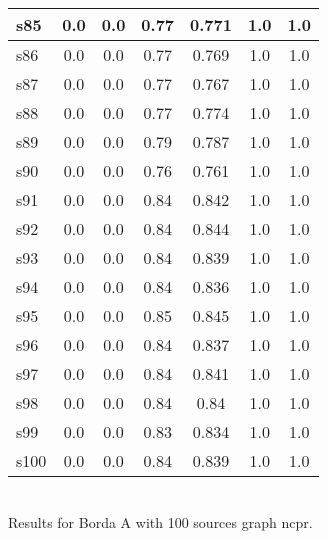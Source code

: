 \documentclass{article}
\begin{document}
\begin{tabular}{|l|c|c|c|c|c|c|}
\hline
s85 &0.0 & 0.0 & 0.77 & 0.771 & 1.0 & 1.0\\
\hline
s86 &0.0 & 0.0 & 0.77 & 0.769 & 1.0 & 1.0\\
\hline
s87 &0.0 & 0.0 & 0.77 & 0.767 & 1.0 & 1.0\\
\hline
s88 &0.0 & 0.0 & 0.77 & 0.774 & 1.0 & 1.0\\
\hline
s89 &0.0 & 0.0 & 0.79 & 0.787 & 1.0 & 1.0\\
\hline
s90 &0.0 & 0.0 & 0.76 & 0.761 & 1.0 & 1.0\\
\hline
s91 &0.0 & 0.0 & 0.84 & 0.842 & 1.0 & 1.0\\
\hline
s92 &0.0 & 0.0 & 0.84 & 0.844 & 1.0 & 1.0\\
\hline
s93 &0.0 & 0.0 & 0.84 & 0.839 & 1.0 & 1.0\\
\hline
s94 &0.0 & 0.0 & 0.84 & 0.836 & 1.0 & 1.0\\
\hline
s95 &0.0 & 0.0 & 0.85 & 0.845 & 1.0 & 1.0\\
\hline
s96 &0.0 & 0.0 & 0.84 & 0.837 & 1.0 & 1.0\\
\hline
s97 &0.0 & 0.0 & 0.84 & 0.841 & 1.0 & 1.0\\
\hline
s98 &0.0 & 0.0 & 0.84 & 0.84 & 1.0 & 1.0\\
\hline
s99 &0.0 & 0.0 & 0.83 & 0.834 & 1.0 & 1.0\\
\hline
s100 &0.0 & 0.0 & 0.84 & 0.839 & 1.0 & 1.0\\
\hline
\end{tabular}\\

\noindent Results for Borda A with 100 sources graph ncpr.
\end{document}
